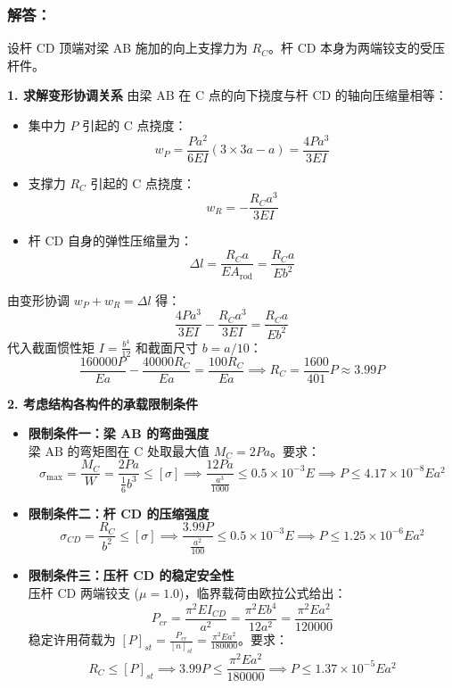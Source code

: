 \documentclass[11pt,a4paper]{ctexrep}
\begin{document}
{\begin{center}
\end{center}

\subsubsection*{解答：}

设杆 CD 顶端对梁 AB 施加的向上支撑力为 $R_C$。杆 CD 本身为两端铰支的受压杆件。

\textbf{1. 求解变形协调关系}
由梁 AB 在 C 点的向下挠度与杆 CD 的轴向压缩量相等：
\begin{itemize}
    \item 集中力 $P$ 引起的 C 点挠度：
    \[
    w_P = \frac{Pa^2}{6EI}(3 \times 3a - a) = \frac{4Pa^3}{3EI}
    \]
    \item 支撑力 $R_C$ 引起的 C 点挠度：
    \[
    w_R = -\frac{R_C a^3}{3EI}
    \]
    \item 杆 CD 自身的弹性压缩量为：
    \[
    \Delta l = \frac{R_C a}{EA_{\text{rod}}} = \frac{R_C a}{E b^2}
    \]
\end{itemize}
由变形协调 $w_P + w_R = \Delta l$ 得：
\[
\frac{4Pa^3}{3EI} - \frac{R_C a^3}{3EI} = \frac{R_C a}{E b^2}
\]
代入截面惯性矩 $I = \frac{b^4}{12}$ 和截面尺寸 $b = a/10$：
\[
\frac{160000 P}{E a} - \frac{40000 R_C}{E a} = \frac{100 R_C}{E a} \implies R_C = \frac{1600}{401}P \approx 3.99 P
\]

\textbf{2. 考虑结构各构件的承载限制条件}
\begin{itemize}
    \item \textbf{限制条件一：梁 AB 的弯曲强度} \\
    梁 AB 的弯矩图在 C 处取最大值 $M_C = 2Pa$。要求：
    \[
    \sigma_{\max} = \frac{M_C}{W} = \frac{2Pa}{\frac{1}{6}b^3} \le [\sigma] \implies \frac{12Pa}{\frac{a^3}{1000}} \le 0.5 \times 10^{-3} E \implies P \le 4.17 \times 10^{-8} Ea^2
    \]
    \item \textbf{限制条件二：杆 CD 的压缩强度} \\
    \[
    \sigma_{CD} = \frac{R_C}{b^2} \le [\sigma] \implies \frac{3.99 P}{\frac{a^2}{100}} \le 0.5 \times 10^{-3} E \implies P \le 1.25 \times 10^{-6} Ea^2
    \]
    \item \textbf{限制条件三：压杆 CD 的稳定安全性} \\
    压杆 CD 两端铰支 ($\mu = 1.0$)，临界载荷由欧拉公式给出：
    \[
    P_{cr} = \frac{\pi^2 EI_{CD}}{a^2} = \frac{\pi^2 E b^4}{12 a^2} = \frac{\pi^2 E a^2}{120000}
    \]
    稳定许用荷载为 $[P]_{st} = \frac{P_{cr}}{[n]_{st}} = \frac{\pi^2 E a^2}{180000}$。要求：
    \[
    R_C \le [P]_{st} \implies 3.99 P \le \frac{\pi^2 E a^2}{180000} \implies P \le 1.37 \times 10^{-5} Ea^2
    \]
\end{itemize}

}
\end{document}
